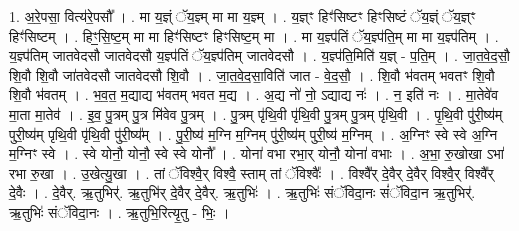 \documentclass[17pt]{extarticle}
\begin{document}
1. अ॒रे॒पसा॒ वित्य॑रे॒पसौ᳚ । . मा य॒ज्ञ्ं ॅय॒ज्ञ्म् मा मा य॒ज्ञ्म् । . य॒ज्ञ्ꣳ हिꣳ॑सिष्टꣳ हिꣳसिष्टं ॅय॒ज्ञ्ं ॅय॒ज्ञ्ꣳ हिꣳ॑सिष्टम् । . हिꣳ॒॒सि॒ष्ट॒म् मा मा हिꣳ॑सिष्टꣳ हिꣳसिष्ट॒म् मा । . मा य॒ज्ञ्प॑तिं ॅय॒ज्ञ्प॑ति॒म् मा मा य॒ज्ञ्प॑तिम् । . य॒ज्ञ्प॑तिम् जातवेदसौ जातवेदसौ य॒ज्ञ्प॑तिं ॅय॒ज्ञ्प॑तिम् जातवेदसौ । . य॒ज्ञ्प॑ति॒मिति॑ य॒ज्ञ् - प॒ति॒म् । . जा॒त॒वे॒द॒सौ॒ शि॒वौ शि॒वौ जा॑तवेदसौ जातवेदसौ शि॒वौ । . जा॒त॒वे॒द॒सा॒विति॑ जात - वे॒द॒सौ॒ । . शि॒वौ भ॑वतम् भवतꣳ शि॒वौ शि॒वौ भ॑वतम् । . भ॒व॒त॒ म॒द्याद्य भ॑वतम् भवत म॒द्य । . अ॒द्य नो॑ नो॒ ऽद्याद्य नः॑ । . न॒ इति॑ नः । . मा॒तेवे॑व मा॒ता मा॒तेव॑ । . इ॒व॒ पु॒त्रम् पु॒त्र मि॑वेव पु॒त्रम् । . पु॒त्रम् पृ॑थि॒वी पृ॑थि॒वी पु॒त्रम् पु॒त्रम् पृ॑थि॒वी । . पृ॒थि॒वी पु॑री॒ष्य॑म् पुरी॒ष्य॑म् पृथि॒वी पृ॑थि॒वी पु॑री॒ष्य᳚म् । . पु॒री॒ष्य॑ म॒ग्नि म॒ग्निम् पु॑री॒ष्य॑म् पुरी॒ष्य॑ म॒ग्निम् । . अ॒ग्निꣳ स्वे स्वे अ॒ग्नि म॒ग्निꣳ स्वे । . स्वे योनौ॒ योनौ॒ स्वे स्वे योनौ᳚ । . योना॑ वभा रभा॒र् योनौ॒ योना॑ वभाः । . अ॒भा॒ रु॒खोखा ऽभा॑ रभा रु॒खा । . उ॒खेत्यु॒खा । . तां ॅविश्वै॒र् विश्वै॒ स्ताम् तां ॅविश्वैः᳚ । . विश्वै᳚र् दे॒वैर् दे॒वैर् विश्वै॒र् विश्वै᳚र् दे॒वैः । . दे॒वैर्. ऋ॒तुभिर्॑. ऋ॒तुभि॑र् दे॒वैर् दे॒वैर्. ऋ॒तुभिः॑ । . ऋ॒तुभिः॑ संॅविदा॒नः सं॑ॅविदा॒न ऋ॒तुभिर्॑. ऋ॒तुभिः॑ संॅविदा॒नः । . ऋ॒तुभि॒रित्यृ॒तु - भिः॒ । \newline
\end{document}
